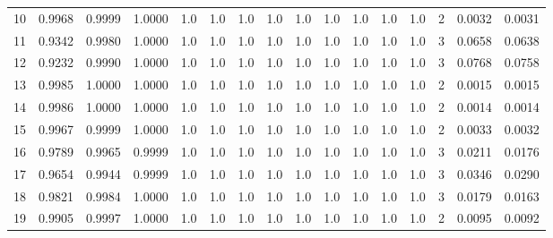 \begin{tabular}{lrrrrrrrrrrrrrrr}
10 &      0.9968 &  0.9999 &  1.0000 &     1.0 &     1.0 &     1.0 &     1.0 &     1.0 &     1.0 &     1.0 &      1.0 &        1.0 &      2 &                    0.0032 &                     0.0031 \\
11 &      0.9342 &  0.9980 &  1.0000 &     1.0 &     1.0 &     1.0 &     1.0 &     1.0 &     1.0 &     1.0 &      1.0 &        1.0 &      3 &                    0.0658 &                     0.0638 \\
12 &      0.9232 &  0.9990 &  1.0000 &     1.0 &     1.0 &     1.0 &     1.0 &     1.0 &     1.0 &     1.0 &      1.0 &        1.0 &      3 &                    0.0768 &                     0.0758 \\
13 &      0.9985 &  1.0000 &  1.0000 &     1.0 &     1.0 &     1.0 &     1.0 &     1.0 &     1.0 &     1.0 &      1.0 &        1.0 &      2 &                    0.0015 &                     0.0015 \\
14 &      0.9986 &  1.0000 &  1.0000 &     1.0 &     1.0 &     1.0 &     1.0 &     1.0 &     1.0 &     1.0 &      1.0 &        1.0 &      2 &                    0.0014 &                     0.0014 \\
15 &      0.9967 &  0.9999 &  1.0000 &     1.0 &     1.0 &     1.0 &     1.0 &     1.0 &     1.0 &     1.0 &      1.0 &        1.0 &      2 &                    0.0033 &                     0.0032 \\
16 &      0.9789 &  0.9965 &  0.9999 &     1.0 &     1.0 &     1.0 &     1.0 &     1.0 &     1.0 &     1.0 &      1.0 &        1.0 &      3 &                    0.0211 &                     0.0176 \\
17 &      0.9654 &  0.9944 &  0.9999 &     1.0 &     1.0 &     1.0 &     1.0 &     1.0 &     1.0 &     1.0 &      1.0 &        1.0 &      3 &                    0.0346 &                     0.0290 \\
18 &      0.9821 &  0.9984 &  1.0000 &     1.0 &     1.0 &     1.0 &     1.0 &     1.0 &     1.0 &     1.0 &      1.0 &        1.0 &      3 &                    0.0179 &                     0.0163 \\
19 &      0.9905 &  0.9997 &  1.0000 &     1.0 &     1.0 &     1.0 &     1.0 &     1.0 &     1.0 &     1.0 &      1.0 &        1.0 &      2 &                    0.0095 &                     0.0092 \\
\bottomrule
\end{tabular}
